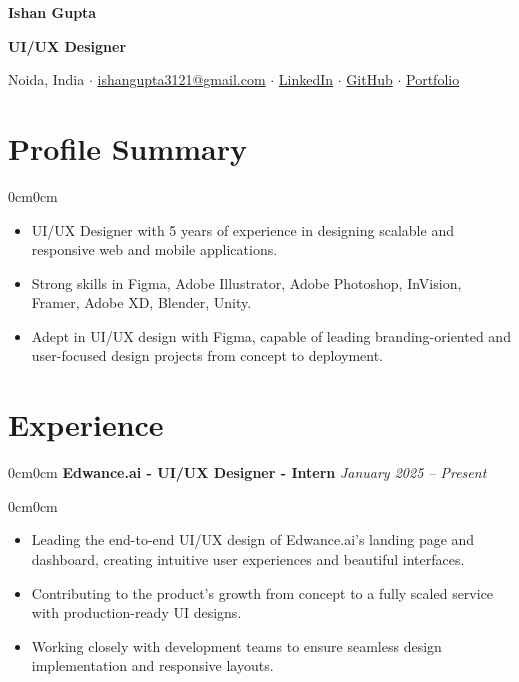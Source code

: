 \documentclass[10pt, letterpaper]{article}
\newenvironment{highlights}{\begin{itemize}[topsep=0.10 cm, parsep=0.10 cm, partopsep=0pt, itemsep=0pt, leftmargin=10pt]}{\end{itemize}}
\newenvironment{onecolentry}{\begin{adjustwidth}{0cm}{0cm}}{\end{adjustwidth}}
\begin{document}
\begin{center}
    {\LARGE \textbf{Ishan Gupta}} \\
    \begin{center}
        \textbf{UI/UX Designer}
    \end{center}
    Noida, India $\cdot$ \href{mailto:ishangupta3121@gmail.com}{ishangupta3121@gmail.com} $\cdot$ \href{https://linkedin.com/in/ishan-gupta-5b0a20293}{LinkedIn} $\cdot$ \href{https://github.com/ishan-crd}{GitHub} $\cdot$ \href{https://ishanguptaportfolio.vercel.app}{Portfolio}
\end{center}

\section{Profile Summary}
\begin{onecolentry}
    \begin{highlights}
        \item UI/UX Designer with 5 years of experience in designing scalable and responsive web and mobile applications.
        \item Strong skills in Figma, Adobe Illustrator, Adobe Photoshop, InVision, Framer, Adobe XD, Blender, Unity.
        \item Adept in UI/UX design with Figma, capable of leading branding-oriented and user-focused design projects from concept to deployment.
    \end{highlights}
\end{onecolentry}

\section{Experience}

\begin{onecolentry}
    \textbf{Edwance.ai - UI/UX Designer - Intern} \hfill \textit{January 2025 -- Present}
\end{onecolentry}
\vspace{0.2 cm}
\begin{onecolentry}
    \begin{highlights}
        \item Leading the end-to-end UI/UX design of Edwance.ai's landing page and dashboard, creating intuitive user experiences and beautiful interfaces.
        \item Contributing to the product's growth from concept to a fully scaled service with production-ready UI designs.
        \item Working closely with development teams to ensure seamless design implementation and responsive layouts.
    \end{highlights}
\end{onecolentry}
\end{document}
